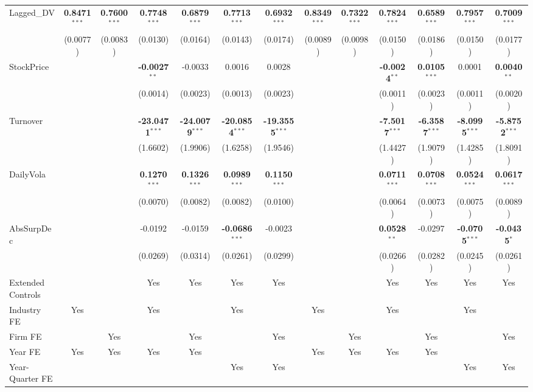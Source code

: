 \begin{landscape}
\begin{table}[H]
\begin{tabular}{lcccccccccccc}
Lagged\_DV & \textbf{0.8471}$^{***}$ & \textbf{0.7600}$^{***}$ & \textbf{0.7748}$^{***}$ & \textbf{0.6879}$^{***}$ & \textbf{0.7713}$^{***}$ & \textbf{0.6932}$^{***}$ & \textbf{0.8349}$^{***}$ & \textbf{0.7322}$^{***}$ & \textbf{0.7824}$^{***}$ & \textbf{0.6589}$^{***}$ & \textbf{0.7957}$^{***}$ & \textbf{0.7009}$^{***}$ \\
 & (0.0077) & (0.0083) & (0.0130) & (0.0164) & (0.0143) & (0.0174) & (0.0089) & (0.0098) & (0.0150) & (0.0186) & (0.0150) & (0.0177) \\
StockPrice &  &  & \textbf{-0.0027}$^{**}$ & -0.0033 & 0.0016 & 0.0028 &  &  & \textbf{-0.0024}$^{**}$ & \textbf{0.0105}$^{***}$ & 0.0001 & \textbf{0.0040}$^{**}$ \\
 &  &  & (0.0014) & (0.0023) & (0.0013) & (0.0023) &  &  & (0.0011) & (0.0023) & (0.0011) & (0.0020) \\
Turnover &  &  & \textbf{-23.0471}$^{***}$ & \textbf{-24.0079}$^{***}$ & \textbf{-20.0854}$^{***}$ & \textbf{-19.3555}$^{***}$ &  &  & \textbf{-7.5017}$^{***}$ & \textbf{-6.3587}$^{***}$ & \textbf{-8.0995}$^{***}$ & \textbf{-5.8752}$^{***}$ \\
 &  &  & (1.6602) & (1.9906) & (1.6258) & (1.9546) &  &  & (1.4427) & (1.9079) & (1.4285) & (1.8091) \\
DailyVola &  &  & \textbf{0.1270}$^{***}$ & \textbf{0.1326}$^{***}$ & \textbf{0.0989}$^{***}$ & \textbf{0.1150}$^{***}$ &  &  & \textbf{0.0711}$^{***}$ & \textbf{0.0708}$^{***}$ & \textbf{0.0524}$^{***}$ & \textbf{0.0617}$^{***}$ \\
 &  &  & (0.0070) & (0.0082) & (0.0082) & (0.0100) &  &  & (0.0064) & (0.0073) & (0.0075) & (0.0089) \\
AbsSurpDec &  &  & -0.0192 & -0.0159 & \textbf{-0.0686}$^{***}$ & -0.0023 &  &  & \textbf{0.0528}$^{**}$ & -0.0297 & \textbf{-0.0705}$^{***}$ & \textbf{-0.0435}$^{*}$ \\
 &  &  & (0.0269) & (0.0314) & (0.0261) & (0.0299) &  &  & (0.0266) & (0.0282) & (0.0245) & (0.0261) \\
\midrule
Extended Controls &  &  & Yes & Yes & Yes & Yes &  &  & Yes & Yes & Yes & Yes \\
Industry FE & Yes &  & Yes &  & Yes &  & Yes &  & Yes &  & Yes &  \\
Firm FE &  & Yes &  & Yes &  & Yes &  & Yes &  & Yes &  & Yes \\
Year FE & Yes & Yes & Yes & Yes &  &  & Yes & Yes & Yes & Yes &  &  \\
Year-Quarter FE &  &  &  &  & Yes & Yes &  &  &  &  & Yes & Yes \\

\end{tabular}
\end{table}
\end{landscape}
